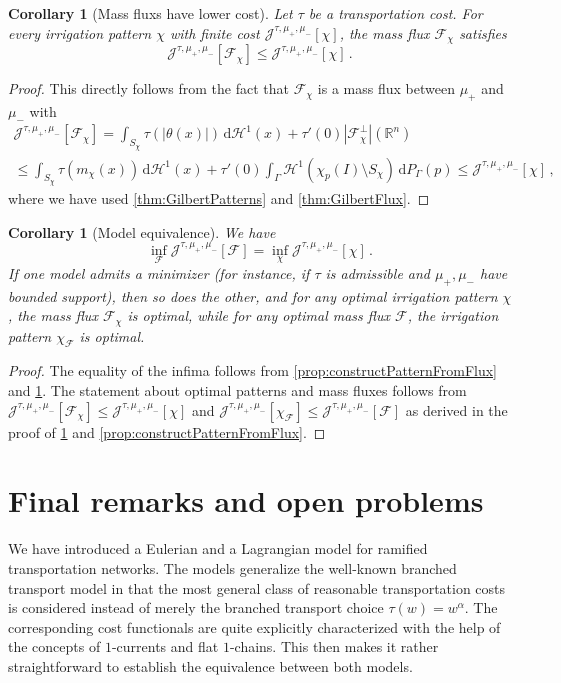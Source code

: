 \documentclass[10pt,a4paper,oneside,final]{article}
\newcommand{\R}{{\mathbb{R}}}
\newcommand{\de}{{\mathrm{d}}}
\newcommand{\hdone}{\mathcal{H}^1}
\newcommand{\flux}{{\mathcal{F}}}
\newcommand{\reSpace}{\Gamma}
\newcommand{\reMeasure}{P_{\reSpace}}
\newcommand{\JEn}{{\mathcal{J}}}
\newcommand{\transportPath}{mass flux}
\newcommand{\transportPaths}{mass fluxes}
\newcommand{\TransportPath}{Mass flux}
\numberwithin{equation}{section}
\theoremstyle{plain}
\newtheorem{corollary}[theorem]{Corollary}
\theoremstyle{definition}
\theoremstyle{remark}
\begin{document}
\begin{corollary}[\TransportPath{}s have lower cost]\label{thm:PatternsLowerCost}
Let $\tau$ be a transportation cost.
For every irrigation pattern $\chi$ with finite cost $\JEn^{\tau,\mu_+,\mu_-}[\chi]$, the \transportPath{} $\flux_\chi$ satisfies
\begin{displaymath}
\JEn^{\tau,\mu_+,\mu_-}[\flux_\chi]\leq\JEn^{\tau,\mu_+,\mu_-}[\chi]\,.
\end{displaymath}
\end{corollary}
\begin{proof}
This directly follows from the fact that $\flux_\chi$ is a \transportPath{} between $\mu_+$ and $\mu_-$ with
\begin{multline*}
\JEn^{\tau,\mu_+,\mu_-}[\flux_\chi]
=\int_{S_\chi}\tau(|\theta(x)|)\,\de\hdone(x)+\tau'(0)|\flux_\chi^\perp|(\R^n)\\
\leq\int_{S_\chi}\tau(m_\chi(x))\,\de\hdone(x)+\tau'(0)\int_\reSpace\hdone(\chi_p(I)\setminus S_\chi)\,\de\reMeasure(p)
\leq\JEn^{\tau,\mu_+,\mu_-}[\chi]\,,
\end{multline*}
where we have used \cref{thm:GilbertPatterns} and \cref{thm:GilbertFlux}.
\end{proof}

\begin{corollary}[Model equivalence]\label{thm:modelEquivalence}
We have
\begin{displaymath}
\inf_\flux\JEn^{\tau,\mu_+,\mu_-}[\flux]=\inf_{\chi}\JEn^{\tau,\mu_+,\mu_-}[\chi]\,.
\end{displaymath}
If one model admits a minimizer (for instance, if $\tau$ is admissible and $\mu_+,\mu_-$ have bounded support), then so does the other, and for any optimal irrigation pattern $\chi$, the \transportPath{} $\flux_\chi$ is optimal,
while for any optimal \transportPath{} $\flux$, the irrigation pattern $\chi_\flux$ is optimal.
\end{corollary}
\begin{proof}
The equality of the infima follows from \cref{prop:constructPatternFromFlux} and \cref{thm:PatternsLowerCost}.
The statement about optimal patterns and \transportPaths{} follows from $\JEn^{\tau,\mu_+,\mu_-}[\flux_\chi]\leq\JEn^{\tau,\mu_+,\mu_-}[\chi]$
and $\JEn^{\tau,\mu_+,\mu_-}[\chi_\flux]\leq\JEn^{\tau,\mu_+,\mu_-}[\flux]$ as derived in the proof of \cref{thm:PatternsLowerCost} and \cref{prop:constructPatternFromFlux}.
\end{proof}

\section{Final remarks and open problems}
We have introduced a Eulerian and a Lagrangian model for ramified transportation networks.
The models generalize the well-known branched transport model in that the most general class of reasonable transportation costs is considered instead of merely the branched transport choice $\tau(w)=w^\alpha$.
The corresponding cost functionals are quite explicitly characterized with the help of the concepts of $1$-currents and flat $1$-chains.
This then makes it rather straightforward to establish the equivalence between both models.
\end{document}
